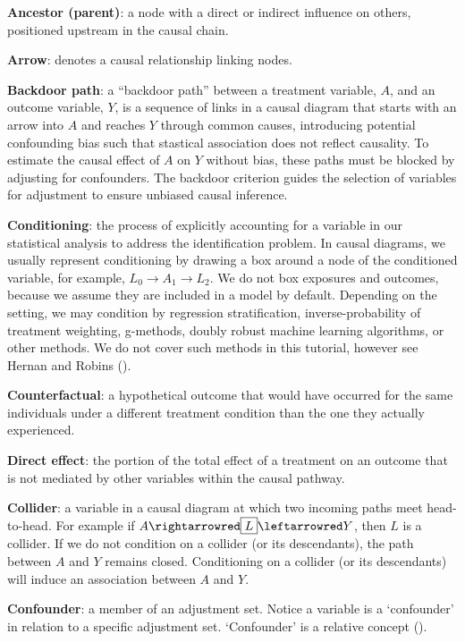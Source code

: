 \documentclass[
  singlecolumn]{article}
\begin{document}
\textbf{Ancestor (parent)}: a node with a direct or indirect influence
on others, positioned upstream in the causal chain.

\textbf{Arrow}: denotes a causal relationship linking nodes.

\textbf{Backdoor path}: a ``backdoor path'' between a treatment
variable, \(A\), and an outcome variable, \(Y\), is a sequence of links
in a causal diagram that starts with an arrow into \(A\) and reaches
\(Y\) through common causes, introducing potential confounding bias such
that stastical association does not reflect causality. To estimate the
causal effect of \(A\) on \(Y\) without bias, these paths must be
blocked by adjusting for confounders. The backdoor criterion guides the
selection of variables for adjustment to ensure unbiased causal
inference.

\textbf{Conditioning}: the process of explicitly accounting for a
variable in our statistical analysis to address the identification
problem. In causal diagrams, we usually represent conditioning by
drawing a box around a node of the conditioned variable, for example,
\(\boxed{L_{0}}\to A_{1} \to L_{2}\). We do not box exposures and
outcomes, because we assume they are included in a model by default.
Depending on the setting, we may condition by regression stratification,
inverse-probability of treatment weighting, g-methods, doubly robust
machine learning algorithms, or other methods. We do not cover such
methods in this tutorial, however see Hernan and Robins
().

\textbf{Counterfactual}: a hypothetical outcome that would have occurred
for the same individuals under a different treatment condition than the
one they actually experienced.

\textbf{Direct effect}: the portion of the total effect of a treatment
on an outcome that is not mediated by other variables within the causal
pathway.

\textbf{Collider}: a variable in a causal diagram at which two incoming
paths meet head-to-head. For example if
\(A \rightarrowred \boxed{L} \leftarrowred Y\), then \(L\) is a
collider. If we do not condition on a collider (or its descendants), the
path between \(A\) and \(Y\) remains closed. Conditioning on a collider
(or its descendants) will induce an association between \(A\) and \(Y\).

\textbf{Confounder}: a member of an adjustment set. Notice a variable is
a `confounder' in relation to a specific adjustment set. `Confounder' is
a relative concept ().
\end{document}
